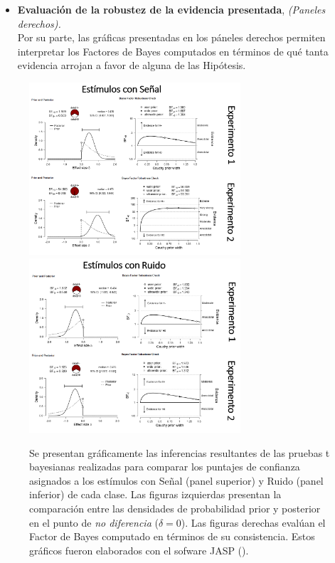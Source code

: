 \begin{itemize}
\item \textbf{Evaluación de la robustez de la evidencia presentada}, \textit{(Paneles derechos).}\\

Por su parte, las gráficas presentadas en los páneles derechos permiten interpretar los Factores de Bayes computados en términos de qué tanta evidencia arrojan a favor de alguna de las Hipótesis.\\

\end{itemize}

\begin{figure}[th]
\centering
\includegraphics[width=0.7\textwidth]{Figures/JASP_Tbayesian_Signals}\\ 
\includegraphics[width=0.7\textwidth]{Figures/JASP_Tbayesian_Noise}\\ 
\caption[Densidad posterior e interpretación de la evidencia acumulada en favor de la diferencia entre los puntajes registrados por cada clase, de acuerdo con una prueba t bayesiana]{Se presentan gráficamente las inferencias resultantes de las pruebas t bayesianas realizadas para comparar los puntajes de confianza asignados a los estímulos con Señal (panel superior) y Ruido (panel inferior) de cada clase. Las figuras izquierdas presentan la comparación entre las densidades de probabilidad prior y posterior en el punto de \textit{no diferencia} ($\delta = 0$). Las figuras derechas evalúan el Factor de Bayes computado en términos de su consistencia. Estos gráficos fueron elaborados con el sofware JASP (\citeyear{JASP}).}
\label{fig:JASP_Tbayesian}
\end{figure}

